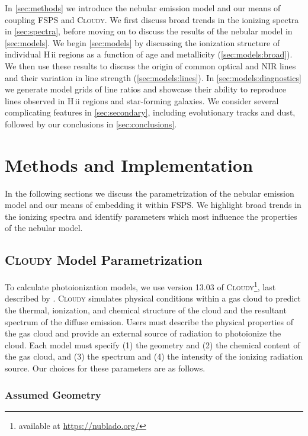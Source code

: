 \documentclass[trackchanges, twocolumn, tighten]{aastex61}
\newcommand{\Sec}[1]{\autoref{sec:#1}}
\newcommand{\FSPS}{{\sc FSPS}\xspace}
\newcommand{\Cloudy}{\textsc{Cloudy}\xspace}
\newcommand{\hii}{H\,{\sc ii}\xspace}
\begin{document}
In \Sec{methods} we introduce the nebular emission model and our means of coupling \FSPS and \Cloudy. We first discuss broad trends in the ionizing spectra in \Sec{spectra}, before moving on to discuss the results of the nebular model in \Sec{models}. We begin \Sec{models} by discussing the ionization structure of individual \hii regions as a function of age and metallicity (\Sec{models:broad}). We then use these results to discuss the origin of common optical and NIR lines and their variation in line strength (\Sec{models:lines}). In \Sec{models:diagnostics} we generate model grids of line ratios and showcase their ability to reproduce lines observed in \hii regions and star-forming galaxies. We consider several complicating features in \Sec{secondary}, including evolutionary tracks and dust, followed by our conclusions in \Sec{conclusions}.

\section{Methods and Implementation}\label{sec:methods}

In the following sections we discuss the parametrization of the nebular emission model and our means of embedding it within \FSPS. We highlight broad trends in the ionizing spectra and identify parameters which most influence the properties of the nebular model.

\subsection{\Cloudy Model Parametrization}\label{sec:methods:cloudy}

To calculate photoionization models, we use version 13.03 of \Cloudy\footnote{available at \url{https://nublado.org/}}, last described by \citet{Ferland13}. \Cloudy simulates physical conditions within a gas cloud to predict the thermal, ionization, and chemical structure of the cloud and the resultant spectrum of the diffuse emission. Users must describe the physical properties of the gas cloud and provide an external source of radiation to photoionize the cloud. Each model must specify (1) the geometry and (2) the chemical content of the gas cloud, and (3) the spectrum and (4) the intensity of the ionizing radiation source. Our choices for these parameters are as follows.

\subsubsection{Assumed Geometry}\label{sec:methods:cloudy:geom}
\end{document}
